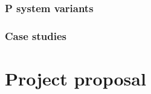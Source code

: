 \documentclass[12pt,oneside,openany,pagenumber=footcenter]{book}
\begin{document}



\section{P system variants} %
\label{sec:p_system_variants}



\section{Case studies} %
\label{sec:case_studies}






\part{Project proposal} %
\label{prt:project_proposal}





\backmatter





\printindex
\end{document}
